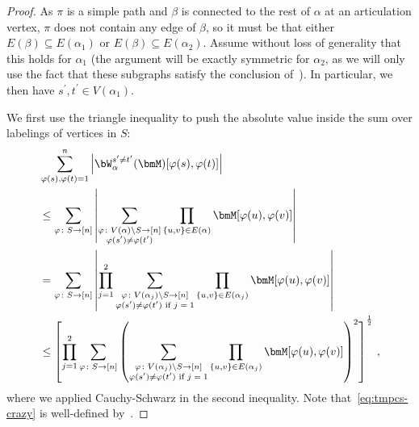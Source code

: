 \begin{proof}
    As $\pi$ is a simple path and $\beta$ is connected to the rest of $\alpha$ at an articulation vertex, $\pi$
    does not contain any edge of $\beta$, so it
    must be that either $E(\beta)\subseteq E(\alpha_1)$ or $E(\beta)\subseteq E(\alpha_2)$. Assume without loss of generality that this holds for $\alpha_1$ (the argument will be exactly symmetric for $\alpha_2$, as we will only use the fact that these subgraphs satisfy the conclusion of~).
    In particular, we then have $s^{\prime}, t^{\prime} \in V(\alpha_1)$.

    We first use the triangle
    inequality to push the absolute value inside
    the sum over labelings of vertices in $S$:
    \begingroup
    \allowdisplaybreaks
    \begin{align}
        &\sum_{\varphi(s),\varphi(t)=1}^n \left|\bW_\alpha^{s'\neq t'}(\bmM)[\varphi(s),\varphi(t)]\right|\nonumber\\
        &\le \sum_{\varphi\colon S \to [n]} \left|\sum_{\substack{\varphi\colon V(\alpha)\setminus S\to [n]\\\varphi(s')\neq \varphi(t')}} \prod_{\{u,v\}\in E(\alpha)} \bmM[\varphi(u),\varphi(v)]\right|\label{eq:tmpcs-crazy}\\
        &=\sum_{\varphi\colon S \to [n]} \left| \prod_{j=1}^2 \sum_{\substack{\varphi\colon V(\alpha_j)\setminus S\to [n]\\\varphi(s')\neq \varphi(t')\text{ if $j = 1$}}} \prod_{\{u,v\}\in E(\alpha_j)} \bmM[\varphi(u),\varphi(v)]\right|\nonumber\\
            &\le \left[\prod_{j=1}^2 \sum_{\varphi\colon S \to [n]} \left(  \sum_{\substack{\varphi \colon V(\alpha_j)\setminus S\to [n]\\\varphi(s')\neq \varphi(t')\text{ if $j = 1$}}} \prod_{\{u,v\}\in E(\alpha_j)} \bmM[\varphi(u),\varphi(v)]\right)^2\right]^{\frac 12}\,,\label{eq:cs-crazy}
    \end{align}
    \endgroup
where we applied Cauchy-Schwarz in the second inequality. Note that~\cref{eq:tmpcs-crazy} is
well-defined by~.


\end{proof}
